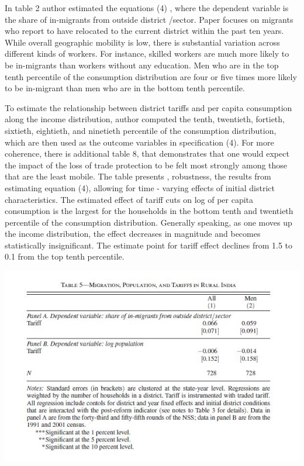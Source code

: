\documentclass[a4paper,12pt]{article}
\begin{document}
In table 2 author estimated the equations (4) , where the dependent variable is the share of in-migrants from outside district /sector.  Paper focuses on migrants who report to have relocated to the current district within the past ten years. While overall geographic mobility is low, there is substantial variation across different kinds of workers. For instance, skilled workers are much more likely to be in-migrants than workers without any education. Men who are in the top tenth percentile of the consumption distribution are four or five times more likely to be in-migrant than men who are in the bottom tenth percentile.  

To estimate the relationship between district tariffs and per capita consumption along the income distribution, author computed the tenth, twentieth, fortieth, sixtieth, eightieth, and ninetieth percentile of the consumption distribution, which are then used
as the outcome variables in specification (4). For more coherence, there is additional table 8, that demonstrates that one would expect the impact of the loss of trade protection to be felt most strongly among those that are the least mobile. The table presents , robustness, the results from estimating equation (4), allowing for time - varying effects of initial district characteristics.  The estimated effect of tariff cuts on log of per capita consumption is the largest for the households in the bottom tenth and twentieth percentile of the consumption distribution.  Generally speaking, as one moves up the income distribution, the effect decreases in magnitude and becomes statistically insignificant.  The estimate point for tariff effect declines from 1.5 to 0.1 from the top tenth percentile. 

\begin{table}[h]
\centering
\includegraphics[width=1\textwidth]{table5.JPG}
\caption{\label{fig:Figure1}}
\end{table}
\end{document}
